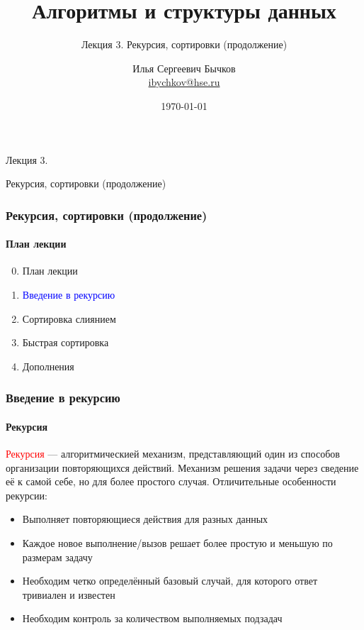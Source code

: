 \documentclass[aspectratio=169]{beamer}
\title[Title]{Алгоритмы и структуры данных}
\subtitle{Лекция 3. Рекурсия, сортировки (продолжение)}
\author[Author's name]{Илья Сергеевич Бычков\\ \smallskip \scriptsize \url{ibychkov@hse.ru}}
\institute{НИУ ВШЭ - Нижний Новгород}
\date{\today}
\begin{document}
\frame[plain]{\titlepage}

\begin{frame}[c]

\begin{center}
\Huge Лекция 3.

\Huge Рекурсия, сортировки (продолжение)
\end{center}

\end{frame}

\begin{frame}
\frametitle{Рекурсия, сортировки (продолжение)}
\framesubtitle{План лекции}

\begin{enumerate}
  \setcounter{enumi}{-1}
  \item{План лекции}
  \item{\textcolor{blue}{Введение в рекурсию}}
  \item{Сортировка слиянием}
  \item{Быстрая сортировка}
  \item{Дополнения}
\end{enumerate}
\end{frame}



\begin{frame}
\frametitle{Введение в рекурсию}
\framesubtitle{Рекурсия}
\justifying
\textcolor{red}{Рекурсия} — алгоритмическией механизм, представляющий один из способов \newline организации повторяющихся действий. Механизм решения задачи через сведение её к самой себе, но для более простого случая.\newline\newline
Отличительные особенности рекурсии:
\begin{itemize}
\item{Выполняет повторяющиеся действия для разных данных}
\item{Каждое новое выполнение/вызов решает более простую и меньшую по размерам задачу}
\item{Необходим четко определённый базовый случай, для которого ответ тривиален и известен}
\item{Необходим контроль за количеством выполняемых подзадач}
\end{itemize}
\end{frame}
\end{document}
